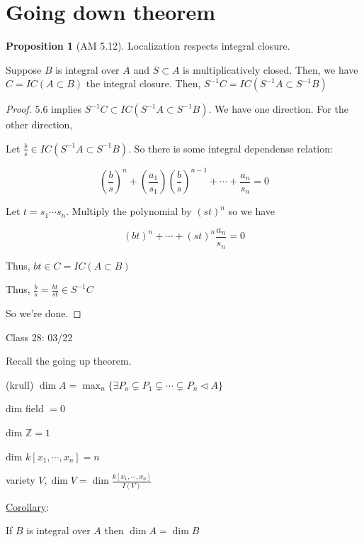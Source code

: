 \documentclass{article}
\theoremstyle{definition}
\newtheorem{proposition}{Proposition}
\begin{document}
\section*{Going down theorem}

\begin{proposition}
    [AM 5.12]

    Localization respects integral closure.

    Suppose \(B\) is integral over \(A\) and \(S \subset A\) is multiplicatively closed. Then, we have \(C = IC (A \subset B)\) the integral closure. Then, \(S ^{-1} C = IC (S ^{-1} A \subset S ^{-1} B)\) 
\end{proposition}

\begin{proof}
    5.6 implies \(S ^{-1} C \subset IC (S ^{-1} A \subset S ^{-1} B)\). We have one direction. For the other direction,
    
    Let \(\frac{b}{s} \in IC (S ^{-1} A \subset S ^{-1}  B)\). So there is some integral dependense relation:
    
    \[
        \left( \frac{b}{s} \right)^n + \left( \frac{a_1}{s_1} \right) \left( \frac{b}{s} \right)^{n - 1} + \cdots + \frac{a_n}{s_n} = 0   
    \]

    Let \(t = s_1 \cdots s_n\). Multiply the polynomial by \((st)^n\) so we have
    
    \[
        (bt)^n + \cdots + (st)^n \frac{a_n}{s_n} = 0
    \]

    Thus, \(bt\in C = IC(A \subset B)\)
    
    Thus, \(\frac{b}{s} = \frac{bt}{st} \in S^{-1} C\) 

    So we're done.
\end{proof}

\hrulefill

Class 28: 03/22

Recall the going up theorem.

(krull) \(\dim A = \max_n \{ \exists P_o \subsetneq P_1 \subsetneq \cdots \subsetneq P_n \triangleleft A \} \) 

dim field \(=0\) 

dim \(\mathbb{Z} = 1\)

dim \(k[x_1,\cdots, x_n] = n\) 

variety \(V, \dim V = \dim \frac{k[x_1,\cdots,x_n]}{I(V)}\) 

\underline{Corollary}:

If \(B\) is integral over \(A\) then \(\dim A = \dim B\)
\end{document}
